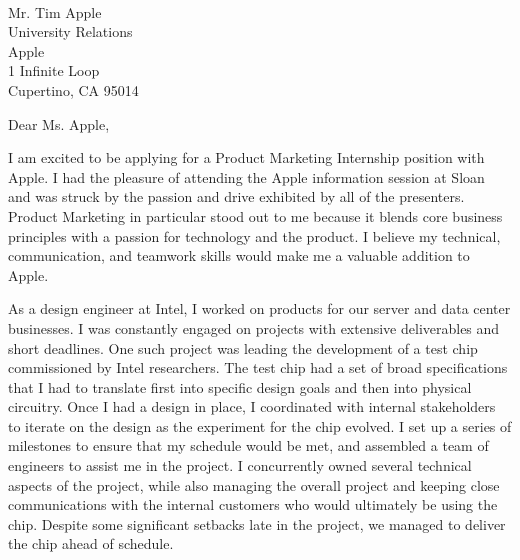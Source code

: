 \documentclass[a4paper,11pt,letter]{business}
\begin{document}

\\


\vspace{\dimexpr 10mm-\baselineskip\relax}

Mr. Tim Apple\\
University Relations\\
Apple\\
1 Infinite Loop\\
Cupertino, CA 95014

Dear Ms. Apple,


I am excited to be applying for a Product Marketing Internship position with Apple.
I had the pleasure of attending the Apple information session at Sloan and was struck by the passion and drive exhibited by all of the presenters.
Product Marketing in particular stood out to me because it blends core business principles with a passion for technology and the product.
I believe my technical, communication, and teamwork skills would make me a valuable addition to Apple.


As a design engineer at Intel, I worked on products for our server and data center businesses.
I was constantly engaged on projects with extensive deliverables and short deadlines.
One such project was leading the development of a test chip commissioned by Intel researchers.
The test chip had a set of broad specifications that I had to translate first into specific design goals and then into physical circuitry.
Once I had a design in place, I coordinated with internal stakeholders to iterate on the design as the experiment for the chip evolved.
I set up a series of milestones to ensure that my schedule would be met, and assembled a team of engineers to assist me in the project.
I concurrently owned several technical aspects of the project, while also managing the overall project and keeping close communications with the internal customers who would ultimately be using the chip.
Despite some significant setbacks late in the project, we managed to deliver the chip ahead of schedule.
\end{document}
